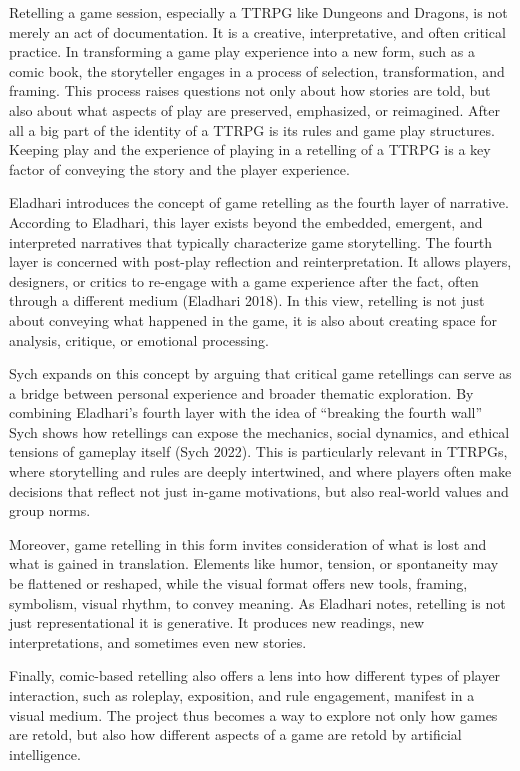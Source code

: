 Retelling a game session, especially a TTRPG like Dungeons and Dragons, is not merely an act of documentation. It is a creative, interpretative, and often critical practice. In transforming a game  play experience into a new form, such as a comic book, the storyteller engages in a process of selection, transformation, and framing. This process raises questions not only about how stories are told, but also about what aspects of play are preserved, emphasized, or reimagined. After all a big part of the identity of a TTRPG is its rules and game play structures. Keeping play and the experience of playing in a retelling of a TTRPG is a key factor of conveying the story and the player experience.

Eladhari introduces the concept of game retelling as the fourth layer of narrative. According to Eladhari, this layer exists beyond the embedded, emergent, and interpreted narratives that typically characterize game storytelling. The fourth layer is concerned with post-play reflection and reinterpretation. It allows players, designers, or critics to re-engage with a game experience after the fact, often through a different medium (Eladhari 2018). In this view, retelling is not just about conveying what happened in the game, it is also about creating space for analysis, critique, or emotional processing.

Sych expands on this concept by arguing that critical game retellings can serve as a bridge between personal experience and broader thematic exploration. By combining Eladhari’s fourth layer with the idea of “breaking the fourth wall” Sych shows how retellings can expose the mechanics, social dynamics, and ethical tensions of gameplay itself (Sych 2022). This is particularly relevant in TTRPGs, where storytelling and rules are deeply intertwined, and where players often make decisions that reflect not just in-game motivations, but also real-world values and group norms.

Moreover, game retelling in this form invites consideration of what is lost and what is gained in translation. Elements like humor, tension, or spontaneity may be flattened or reshaped, while the visual format offers new tools, framing, symbolism, visual rhythm, to convey meaning. As Eladhari notes, retelling is not just representational it is generative. It produces new readings, new interpretations, and sometimes even new stories.

Finally, comic-based retelling also offers a lens into how different types of player interaction, such as roleplay, exposition, and rule engagement, manifest in a visual medium. The project thus becomes a way to explore not only how games are retold, but also how different aspects of a game are retold by artificial intelligence.


